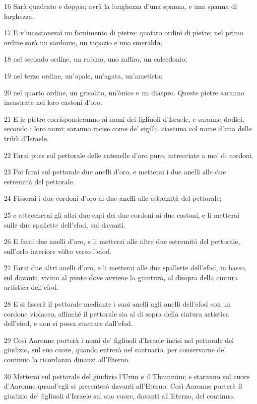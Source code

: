 \par 16 Sarà quadrato e doppio; avrà la lunghezza d'una spanna, e una spanna di larghezza.
\par 17 E v'incastonerai un fornimento di pietre: quattro ordini di pietre; nel primo ordine sarà un sardonio, un topazio e uno smeraldo;
\par 18 nel secondo ordine, un rubino, uno zaffiro, un calcedonio;
\par 19 nel terzo ordine, un'opale, un'agata, un'ametista;
\par 20 nel quarto ordine, un grisolito, un'ònice e un diaspro. Queste pietre saranno incastrate nei loro castoni d'oro.
\par 21 E le pietre corrisponderanno ai nomi dei figliuoli d'Israele, e saranno dodici, secondo i loro nomi; saranno incise come de' sigilli, ciascuna col nome d'una delle tribù d'Israele.
\par 22 Farai pure sul pettorale delle catenelle d'oro puro, intrecciate a mo' di cordoni.
\par 23 Poi farai sul pettorale due anelli d'oro, e metterai i due anelli alle due estremità del pettorale.
\par 24 Fisserai i due cordoni d'oro ai due anelli alle estremità del pettorale;
\par 25 e attaccherai gli altri due capi dei due cordoni ai due castoni, e li metterai sulle due spallette dell'efod, sul davanti.
\par 26 E farai due anelli d'oro, e li metterai alle altre due estremità del pettorale, sull'orlo interiore vòlto verso l'efod.
\par 27 Farai due altri anelli d'oro, e li metterai alle due spallette dell'efod, in basso, sul davanti, vicino al punto dove avviene la giuntura, al disopra della cintura artistica dell'efod.
\par 28 E si fisserà il pettorale mediante i suoi anelli agli anelli dell'efod con un cordone violaceo, affinché il pettorale sia al di sopra della cintura artistica dell'efod, e non si possa staccare dall'efod.
\par 29 Così Aaronne porterà i nomi de' figliuoli d'Israele incisi nel pettorale del giudizio, sul suo cuore, quando entrerà nel santuario, per conservarne del continuo la ricordanza dinanzi all'Eterno.
\par 30 Metterai sul pettorale del giudizio l'Urim e il Thummim; e staranno sul cuore d'Aaronne quand'egli si presenterà davanti all'Eterno. Così Aaronne porterà il giudizio de' figliuoli d'Israele sul suo cuore, davanti all'Eterno, del continuo.
